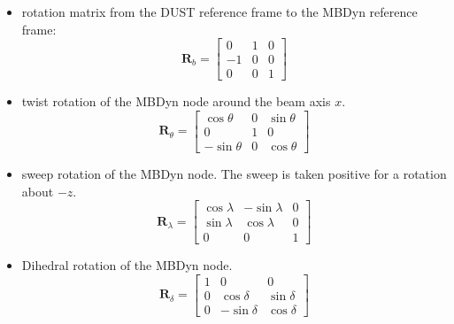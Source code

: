 \begin{itemize}
    \item rotation matrix from the DUST reference frame to the MBDyn reference frame:
    \begin{equation}
        \mathbf{R}_{b} = 
        \begin{bmatrix}
            0 & 1 & 0\\
            -1 & 0 & 0\\
            0 & 0 & 1
        \end{bmatrix}
        \label{eq:rotbeam}
    \end{equation}

    \item twist rotation of the MBDyn node around the beam axis $x$. 
    \begin{equation}
        \mathbf{R}_{\theta} = 
        \begin{bmatrix}
            \cos \theta & 0 & \sin\theta\\ 
            0 & 1 & 0\\ 
            -\sin\theta & 0 & \cos\theta
        \end{bmatrix}
        \label{eq:rottwist}
    \end{equation}
    
    \item sweep rotation of the MBDyn node. 
    The sweep is taken positive for a rotation about $-z$. 
    \begin{equation}
        \mathbf{R}_{\lambda} = 
        \begin{bmatrix}
            \cos\lambda & -\sin\lambda & 0\\ 
            \sin\lambda & \cos\lambda & 0\\ 
            0 & 0 & 1 
        \end{bmatrix}
        \label{eq:rotsweep}
    \end{equation}
    
    \item Dihedral rotation of the MBDyn node. 
    \begin{equation}
        \mathbf{R}_{\delta} = 
        \begin{bmatrix}
            1 & 0 & 0\\ 
            0 & \cos\delta & \sin\delta\\ 
            0 & -\sin\delta & \cos\delta 
        \end{bmatrix}
        \label{eq:rotdih}
    \end{equation}
\end{itemize}




